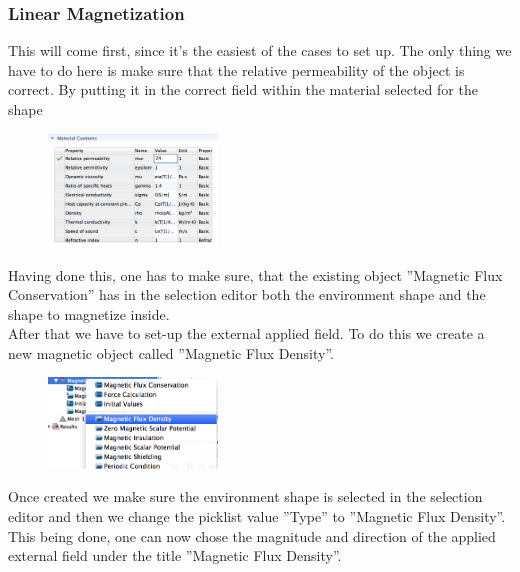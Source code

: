  

\subsubsection{Linear Magnetization}

This will come first, since it's the easiest of the cases to set up. The only thing we have to do here is make sure that the relative permeability of the object is correct. By putting it in the correct field within the material selected for the shape\\
 
\begin{figure}[H]
	\centering
  \includegraphics[width=0.4\textwidth]{Pictures/Screenshots/Sim13.png}
\end{figure}

Having done this, one has to make sure, that the existing object ''Magnetic Flux Conservation'' has in the selection editor both the environment shape and the shape to magnetize inside.\\

After that we have to set-up the external applied field. To do this we create a new magnetic object called ''Magnetic Flux Density''.\\

\begin{figure}[H]
	\centering
  \includegraphics[width=0.4\textwidth]{Pictures/Screenshots/Sim17.png}
\end{figure}

Once created we make sure the environment shape is selected in the selection editor and then we change the picklist value ''Type'' to ''Magnetic Flux Density''. This being done, one can now chose the magnitude and direction of the applied external field under the title ''Magnetic Flux Density''.


